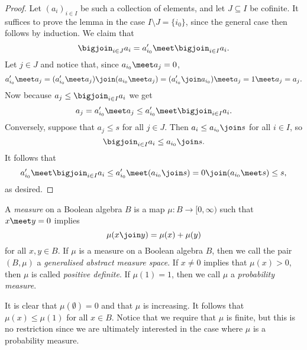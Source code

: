 \documentclass[article, a4paper, 11pt, oneside]{memoir}
\numberwithin{equation}{chapter}
\begin{document}
\begin{proof}
    Let $(a_i)_{i \in I}$ be such a collection of elements, and let $J \subseteq I$ be cofinite. It suffices to prove the lemma in the case $I \setminus J = \{i_0\}$, since the general case then follows by induction. We claim that
    \begin{equation*}
        \bigjoin_{i \in J} a_i
            = a_{i_0}' \meet \bigjoin_{i \in I} a_i.
    \end{equation*}
    Let $j \in J$ and notice that, since $a_{i_0} \meet a_j = 0$,
    \begin{equation*}
        a_{i_0}' \meet a_j
            = (a_{i_0}' \meet a_j) \join (a_{i_0} \meet a_j)
            = (a_{i_0}' \join a_{i_0}) \meet a_j
            = 1 \meet a_j
            = a_j.
    \end{equation*}
    Now because $a_j \leq \bigjoin_{i \in I} a_i$ we get
    \begin{equation*}
        a_j
            = a_{i_0}' \meet a_j
            \leq a_{i_0}' \meet \bigjoin_{i \in I} a_i.
    \end{equation*}
    Conversely, suppose that $a_j \leq s$ for all $j \in J$. Then $a_i \leq a_{i_0} \join s$ for all $i \in I$, so
    \begin{equation*}
        \bigjoin_{i \in I} a_i
            \leq a_{i_0} \join s.
    \end{equation*}
    It follows that
    \begin{equation*}
        a_{i_0}' \meet \bigjoin_{i \in I} a_i
            \leq a_{i_0}' \meet (a_{i_0} \join s)
            = 0 \join (a_{i_0} \meet s)
            \leq s,
    \end{equation*}
    as desired.
\end{proof}





\begin{definition}
    A \emph{measure} on a Boolean algebra $B$ is a map $\mu \colon B \to [0,\infty)$ such that $x \meet y = 0$ implies
    \begin{equation}
        \label{eq:finite-additivity}
        \mu(x \join y)
            = \mu(x) + \mu(y)
    \end{equation}
    for all $x,y \in B$. If $\mu$ is a measure on a Boolean algebra $B$, then we call the pair $(B,\mu)$ a \emph{generalised abstract measure space}. If $x \neq 0$ implies that $\mu(x) > 0$, then $\mu$ is called \emph{positive definite}. If $\mu(1) = 1$, then we call $\mu$ a \emph{probability measure}.
\end{definition}
%
It is clear that $\mu(\emptyset) = 0$ and that $\mu$ is increasing. It follows that $\mu(x) \leq \mu(1)$ for all $x \in B$. Notice that we require that $\mu$ is finite, but this is no restriction since we are ultimately interested in the case where $\mu$ is a probability measure.
\end{document}
